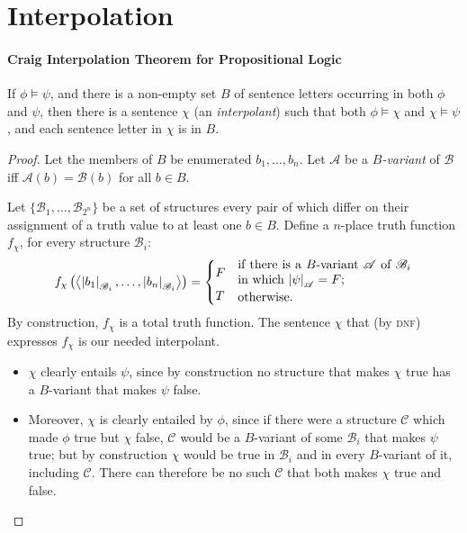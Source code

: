 \section{Interpolation}


\paragraph{Craig Interpolation Theorem for Propositional Logic}

\begin{theorem}\label{thmcraig}If $\phi 
\vDash \psi$, and there is a non-empty set $B$ of sentence letters occurring in both $\phi$ and
$\psi$, then there is a sentence $\chi$ (an \emph{interpolant}) such that both $\phi \vDash \chi$ and
$\chi \vDash \psi$, and each sentence letter in $\chi$ is in $B$. \end{theorem}
\begin{proof} Let the members of $B$ be enumerated $b_{1},\ldots,b_{n}$.
Let $\mathscr{A}$ be a \emph{$B$-variant} of $\mathscr{B}$ iff $\mathscr{A}(b)=\mathscr{B}(b)$ for all $b\in B$. 

 Let $\{\mathscr{B}_{1},\ldots,\mathscr{B}_{2^{n}}\}$ be a set of structures every pair of which differ on their assignment of a truth value to at least one $b \in B$. Define a $n$-place truth function $f_{\chi}$, for every structure $\mathscr{B}_{i}$: \begin{equation*}
f_{\chi}\left(\left\langle\left|{b_{1}}\right|_{\mathscr{B}_{i}},\ldots,\left|{b_{n}}\right|_{\mathscr{B}_{i}}\right\rangle\right) =
 	 \begin{cases} F & \parbox[c]{.4\textwidth}{if there is a $B$-variant $\mathscr{A}$ of $\mathscr{B}_{i}$ in which $\val{\psi}{A}=F$;}\\
T & \parbox[c]{.4\textwidth}{otherwise.}\end{cases}
 \end{equation*}
 By construction, $f_{\chi}$ is a total truth function. 
The sentence $\chi$ that (by \textsc{\lowercase{DNF}}) expresses $f_{\chi}$ is our needed interpolant.
\begin{itemize}
	\item $\chi$ clearly 
	entails $\psi$, since by construction no structure that makes $\chi$ true has a $B$-variant that makes $\psi$ false.
	\item  Moreover, $\chi$ is clearly entailed by $\phi$,
	since if there were a structure $\mathscr{C}$ which made $\phi$ true but $\chi$
	false,  $\mathscr{C}$ would be a $B$-variant of some $\mathscr{B}_{i}$ that makes
	$\psi$ true; but by construction $\chi$ would be true in $\mathscr{B}_{i}$
	and in every $B$-variant of it, including  $\mathscr{C}$. There can
	therefore be no such  $\mathscr{C}$ that both makes $\chi$ true and false.
\end{itemize}  \end{proof}

